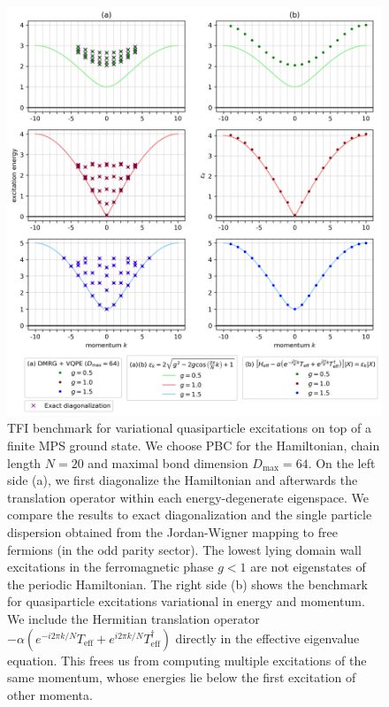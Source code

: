 \newpage
\begin{figure}[H]
  \centering
  \includegraphics[width=1.0\linewidth]{excitations.png}
  \caption{TFI benchmark for variational quasiparticle excitations on top of a finite MPS ground state. We choose PBC for the Hamiltonian, chain length $N = 20$ and maximal bond dimension $D_{\text{max}} = 64$. On the left side (a), we first diagonalize the Hamiltonian and afterwards the translation operator within each energy-degenerate eigenspace. We compare the results to exact diagonalization and the single particle dispersion obtained from the Jordan-Wigner mapping to free fermions (in the odd parity sector). The lowest lying domain wall excitations in the ferromagnetic phase $g < 1$ are not eigenstates of the periodic Hamiltonian. The right side (b) shows the benchmark for quasiparticle excitations variational in energy and momentum. We include the Hermitian translation operator $- \alpha ( e^{-i 2\pi k / N} T_{\text{eff}} + e^{i 2\pi k / N} T_{\text{eff}}^{\dagger} )$ directly in the effective eigenvalue equation. This frees us from computing multiple excitations of the same momentum, whose energies lie below the first excitation of other momenta.}
\label{fig:excitations}
\end{figure}



